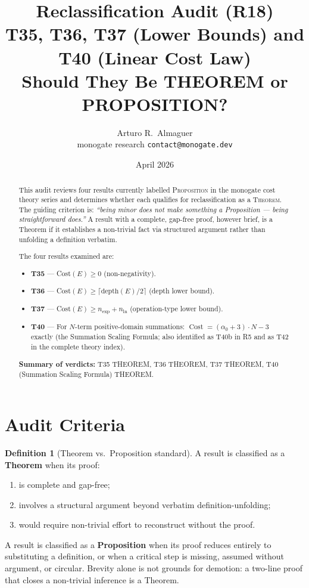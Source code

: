 \documentclass[12pt,a4paper]{article}
\title{Reclassification Audit (R18)\\[6pt]
       \large T35, T36, T37 (Lower Bounds) and T40 (Linear Cost Law)\\
       Should They Be THEOREM or PROPOSITION?}
\author{Arturo R.\ Almaguer\\
\small monogate research \quad \texttt{contact@monogate.dev}}
\date{April 2026}
\theoremstyle{definition}
\newtheorem{definition}[theorem]{Definition}
\newcommand{\Cost}{\operatorname{Cost}}
\begin{document}
\maketitle

\begin{abstract}
This audit reviews four results currently labelled \textsc{Proposition}
in the monogate cost theory series and determines whether each qualifies
for reclassification as a \textsc{Theorem}.  The guiding criterion is:
\emph{``being minor does not make something a Proposition --- being
straightforward does.''}  A result with a complete, gap-free proof,
however brief, is a Theorem if it establishes a non-trivial fact via
structured argument rather than unfolding a definition verbatim.

The four results examined are:
\begin{itemize}
  \item \textbf{T35} --- Cost$(E) \geq 0$ (non-negativity).
  \item \textbf{T36} --- Cost$(E) \geq \lceil\mathrm{depth}(E)/2\rceil$
        (depth lower bound).
  \item \textbf{T37} --- Cost$(E) \geq n_{\exp} + n_{\ln}$
        (operation-type lower bound).
  \item \textbf{T40} --- For $N$-term positive-domain summations:
        $\Cost = (\alpha_0 + 3) \cdot N - 3$ exactly
        (the Summation Scaling Formula; also identified as T40b in R5
        and as T42 in the complete theory index).
\end{itemize}

\noindent\textbf{Summary of verdicts:} T35 THEOREM, T36 THEOREM, T37 THEOREM,
T40 (Summation Scaling Formula) THEOREM.
\end{abstract}

\tableofcontents
\bigskip

\section{Audit Criteria}

\begin{definition}[Theorem vs.\ Proposition standard]
A result is classified as a \textbf{Theorem} when its proof:
\begin{enumerate}
  \item is complete and gap-free;
  \item involves a structural argument beyond verbatim definition-unfolding;
  \item would require non-trivial effort to reconstruct without the proof.
\end{enumerate}
A result is classified as a \textbf{Proposition} when its proof reduces
entirely to substituting a definition, or when a critical step is missing,
assumed without argument, or circular.  Brevity alone is not grounds for
demotion: a two-line proof that closes a non-trivial inference is a Theorem.
\end{definition}
\end{document}
